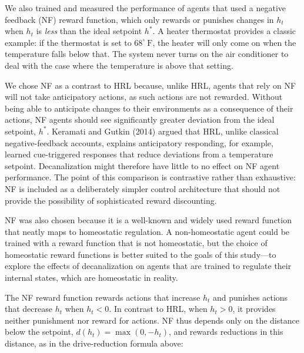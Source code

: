 \documentclass[12pt,fleqn]{article}
\begin{document}
We also trained and measured the performance of agents that used a negative feedback (NF) reward function, which only rewards or punishes changes in \(h_t\) when \(h_t\) is \emph{less} than the ideal setpoint \(h^*\). A heater thermostat provides a classic example: if the thermostat is set to $68^\circ\ \mathrm{F}$, the heater will only come on when the temperature falls below that. The system never turns on the air conditioner to deal with the case where the temperature is above that setting.

We chose NF as a contrast to HRL because, unlike HRL, agents that rely on NF will not take anticipatory actions, as such actions are not rewarded. Without being able to anticipate changes to their environments as a consequence of their actions, NF agents should see significantly greater deviation from the ideal setpoint, \(h^*\). Keramati and Gutkin (2014) argued that HRL, unlike classical negative-feedback accounts, explains anticipatory responding, for example, learned cue-triggered responses that reduce deviations from a temperature setpoint. Decanalization might therefore have little to no effect on NF agent performance. The point of this comparison is contrastive rather than exhaustive: NF is included as a deliberately simpler control architecture that should not provide the possibility of sophisticated reward discounting. 

NF was also chosen because it is a well-known and widely used reward function that neatly maps to homeostatic regulation. A non-homeostatic agent could be trained with a reward function that is not homeostatic, but the choice of homeostatic reward functions is better suited to the goals of this study---to explore the effects of decanalization on agents that are trained to regulate their internal states, which are homeostatic in reality.

The NF reward function rewards actions that increase \(h_t\) and punishes actions that decrease \(h_t\) when \(h_t < 0\). In contrast to HRL, when \(h_t > 0\), it provides neither punishment nor reward for actions. NF thus depends only on the distance below the setpoint, \(d(h_t)=\max(0,-h_t)\), and rewards reductions in this distance, as in the drive-reduction formula above:
\end{document}
